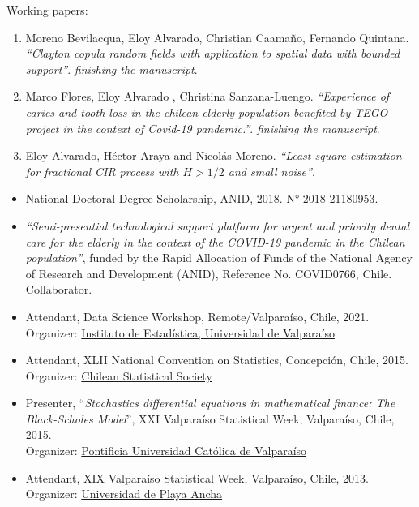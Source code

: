 \documentclass[10pt,a4paper]{article}
\begin{document}
\headedsubsection 
{Working papers:}{}
{\begin{enumerate}
\item Moreno Bevilacqua, Eloy Alvarado, Christian Caamaño, Fernando Quintana. \textit{``Clayton copula random fields with application to spatial data with bounded support''}. \textit{finishing the manuscript}.
\item Marco Flores, Eloy Alvarado , Christina Sanzana-Luengo. \textit{``Experience of caries and tooth loss in the chilean elderly population benefited by TEGO project in the context of Covid-19 pandemic.''}. \textit{finishing the manuscript}.
\item Eloy Alvarado, Héctor Araya and Nicolás Moreno. \textit{``Least square estimation for fractional CIR process with $H>1/2$ and small noise''}.
\end{enumerate}
}

\begin{itemize}
\item National Doctoral Degree Scholarship, ANID, 2018. N° 2018-21180953.
\item \textit{``Semi-presential technological support platform for urgent and
priority dental care for the elderly in the context of the COVID-19 pandemic in the Chilean population''}, funded by the Rapid Allocation of Funds of the National Agency of Research and
Development (ANID), Reference No. COVID0766, Chile. Collaborator.
\end{itemize}




\begin{itemize}
\item Attendant, Data Science Workshop, Remote/Valparaíso, Chile, 2021.\\
Organizer: \href{https://ideuv.uv.cl/}{Instituto de Estadística, Universidad de Valparaíso}

\item Attendant, XLII National Convention on Statistics, Concepción, Chile, 2015. \\
Organizer:  \href{http://www.soche.cl}{ Chilean Statistical
Society}
\item Presenter, ``\textit{Stochastics differential equations in mathematical finance: The Black-Scholes Model}'', XXI Valparaíso Statistical Week, Valparaíso, Chile, 2015. \\ Organizer: \href{http://www.pucv.cl}{Pontificia Universidad Católica de Valparaíso}

\item Attendant, XIX Valparaíso Statistical Week, Valparaíso, Chile, 2013. \\ Organizer:  \href{http://www.upla.cl}{Universidad de Playa Ancha}


\end{itemize}
\end{document}
